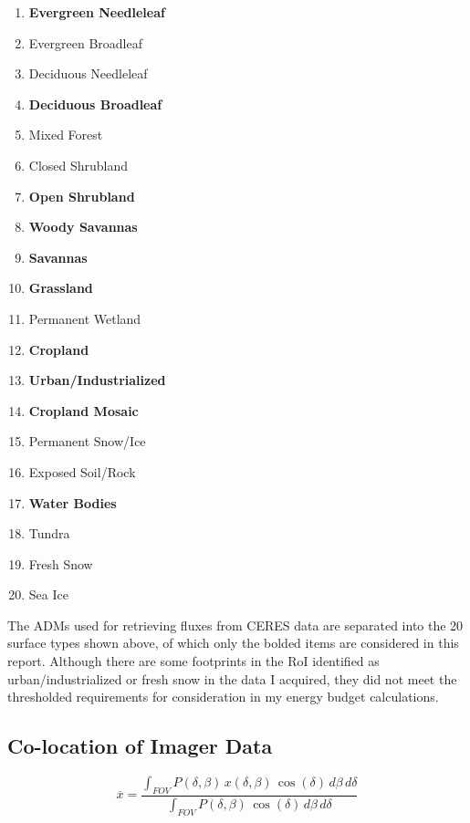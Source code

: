 \documentclass[12pt]{article}
\begin{document}
    \begin{multicols}{3}
        \begin{enumerate}[itemsep=0pt, parsep=0pt, before=\setlength{\baselineskip}{6mm}]
            \item \textbf{Evergreen Needleleaf}
            \item Evergreen Broadleaf
            \item Deciduous Needleleaf
            \item \textbf{Deciduous Broadleaf}
            \item Mixed Forest
            \item Closed Shrubland
            \item \textbf{Open Shrubland}
            \item \textbf{Woody Savannas}
            \item \textbf{Savannas}
            \item \textbf{Grassland}
            \item Permanent Wetland
            \item \textbf{Cropland}
            \item \textbf{Urban/Industrialized}
            \item \textbf{Cropland Mosaic}
            \item Permanent Snow/Ice
            \item Exposed Soil/Rock
            \item \textbf{Water Bodies}
            \item Tundra
            \item Fresh Snow
            \item Sea Ice
        \end{enumerate}
    \end{multicols}

    The ADMs used for retrieving fluxes from CERES data are separated into the 20 surface types shown above, of which only the bolded items are considered in this report. Although there are some footprints in the RoI identified as urban/industrialized or fresh snow in the data I acquired, they did not meet the thresholded requirements for consideration in my energy budget calculations.

    \subsection{Co-location of Imager Data}

    \begin{equation}\label{psf-prop}
        \overline{x} = \frac{\int_{FOV} P(\delta,\beta)\,x(\delta,\beta)\,\cos(\delta)\,d\beta\,d\delta}{\int_{FOV} P(\delta,\beta)\,\cos(\delta)\,d\beta\,d\delta}
    \end{equation}
\end{document}
